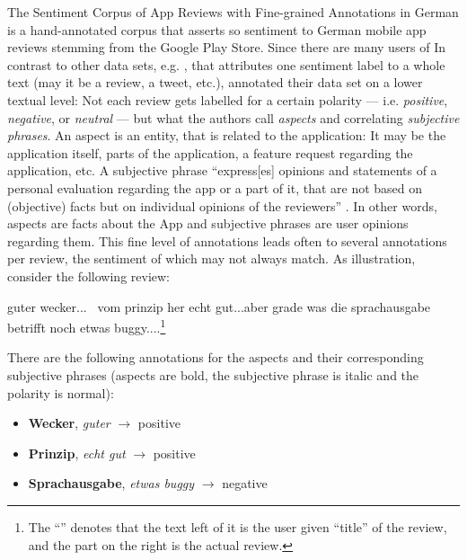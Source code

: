 The Sentiment Corpus of App Reviews with Fine-grained Annotations in German \cite{sanger2016scare} is a hand-annotated corpus that asserts so sentiment to German mobile app reviews stemming from the Google Play Store.
Since there are many users of 
In contrast to other data sets, e.g. \citep{socher2013recursive, go2009twitter}, that attributes one sentiment label to a whole text (may it be a review, a tweet, etc.), \cite{sanger2016scare} annotated their data set on a lower textual level:
Not each review gets labelled for a certain polarity --- i.e. \emph{positive}, \emph{negative}, or \emph{neutral} --- but what the authors call \emph{aspects} and correlating \emph{subjective phrases}.
An aspect is an entity, that is related to the application:
It may be the application itself, parts of the application, a feature request regarding the application, etc.
A subjective phrase ``express[es] opinions and statements of a personal evaluation regarding the app or a part of it, that are not based on (objective) facts but on individual opinions of the reviewers'' \citep[p.~1116]{sanger2016scare}.
In other words, aspects are facts about the App and subjective phrases are user opinions regarding them.
This fine level of annotations leads often to several annotations per review, the sentiment of which may not always match.
As illustration, consider the following review:

\begin{examples}
	\label{ex:fine-grained-anno}
	\item guter wecker... \textbar\textbar\ vom prinzip her echt gut...aber grade was die sprachausgabe betrifft noch etwas buggy....\footnote{The ``\textbar\textbar'' denotes that the text left of it is the user given ``title'' of the review, and the part on the right is the actual review.}
\end{examples}

There are the following annotations for the aspects and their corresponding subjective phrases (aspects are bold, the subjective phrase is italic and the polarity is normal):


\begin{itemize}
	\item \textbf{Wecker}, \textit{guter} $\rightarrow$ positive
	\item \textbf{Prinzip}, \textit{echt gut} $\rightarrow$ positive
	\item \textbf{Sprachausgabe}, \textit{etwas buggy} $\rightarrow$ negative
\end{itemize}


